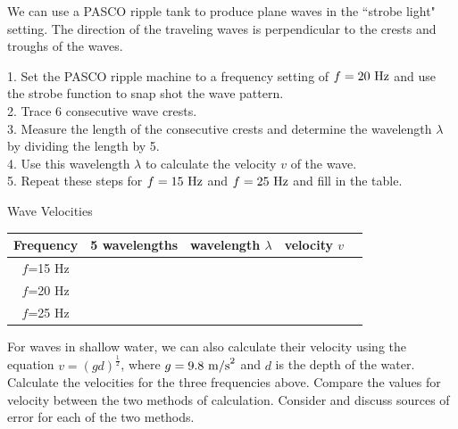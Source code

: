 \documentclass[11pt]{NSF}
\begin{document}
We can use a PASCO ripple tank to produce plane waves in the ``strobe
light" setting.
The direction of the traveling waves is perpendicular to the 
crests and troughs of the waves.

1. Set the PASCO ripple machine to a frequency setting of $f=20~{\rm Hz}$ and use the strobe function to snap shot the wave pattern. \\
2. Trace 6 consecutive wave crests. \\
3. Measure the length of the consecutive crests and determine the wavelength $\lambda$ by 
dividing the length by 5. \\
4. Use this wavelength $\lambda$ to calculate the velocity $v$ of the wave. \\
5. Repeat these steps for  $f=15~{\rm Hz}$ and  $f=25~{\rm Hz}$ and fill in the table. \\
%
\begin{table}[hbtp]
\begin{center}
Wave Velocities\\
\begin{tabular}{| c | c | c | c | c | }
\hline
Frequency & \phantom{ }5 wavelengths\phantom{ } & wavelength $\lambda$ & \phantom{ }velocity $v$\phantom{ } \\
\hline
$f$=15 Hz &  &  &  \\
\hline
$f$=20 Hz  &  &  &  \\
\hline
$f$=25 Hz  &  &  &  \\
\hline
\end{tabular}
\label{t:1}
\end{center}
\end{table}

For waves in shallow water, we can also calculate their velocity using the equation $v = (gd)^\frac{1}{2} $, where $ g = 9.8~{\rm m/s}^{2}$ and $d$ is the depth of the water. Calculate the velocities for the three frequencies above. Compare the values for velocity between the two methods of calculation. Consider and discuss sources of error for each of the two methods. 
\\
\\
\\
\\
\\
\\
\\

\end{document}
